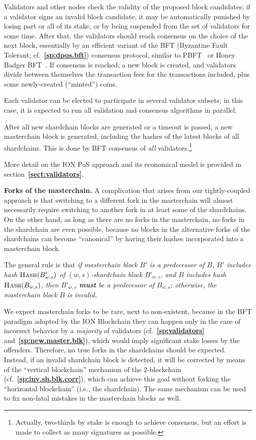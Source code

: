 \documentclass[12pt,oneside]{article}
\def\makepoint#1{\medbreak\noindent{\bf #1.\ }}
\def\nxsubpoint{\refstepcounter{subsubsection}%
  \smallbreak\makepoint{\thesubsubsection}}
\def\refpoint#1{{\rm\textbf{\ref{#1}}}}
\let\ptref=\refpoint
\def\embt(#1.){\textbf{#1.}}
\def\opsc#1{\operatorname{\textsc{#1}}}
\def\Hash{\opsc{Hash}}
\begin{document}
Validators and other nodes check the validity of the proposed block
candidates; if a validator signs an invalid block candidate, it may be
automatically punished by losing part or all of its stake, or by being
suspended from the set of validators for some time. After that, the
validators should reach consensus on the choice of the next block,
essentially by an efficient variant of the BFT (Byzantine Fault
Tolerant; cf.~\ptref{sp:dpos.bft}) consensus protocol, similar to
PBFT~\cite{PBFT} or Honey Badger BFT~\cite{HoneyBadger}. If consensus
is reached, a new block is created, and validators divide between
themselves the transaction fees for the transactions included, plus
some newly-created (``minted'') coins.

Each validator can be elected to participate in several validator
subsets; in this case, it is expected to run all validation and
consensus algorithms in parallel.

After all new shardchain blocks are generated or a timeout is passed,
a new masterchain block is generated, including the hashes of the
latest blocks of all shardchains. This is done by BFT consensus of
{\em all\/} validators.\footnote{Actually, two-thirds by stake is
  enough to achieve consensus, but an effort is made to collect as
  many signatures as possible.}

More detail on the ION PoS approach and its economical model is
provided in section~\ptref{sect:validators}.

\nxsubpoint \embt(Forks of the masterchain.)  A complication that
arises from our tightly-coupled approach is that switching to a
different fork in the masterchain will almost necessarily require
switching to another fork in at least some of the shardchains. On the
other hand, as long as there are no forks in the masterchain, no forks
in the shardchain are even possible, because no blocks in the
alternative forks of the shardchains can become ``canonical'' by
having their hashes incorporated into a masterchain block.

The general rule is that {\em if masterchain block $B'$ is a
  predecessor of $B$, $B'$ includes hash $\Hash(B'_{w,s})$ of
  $(w,s)$-shardchain block $B'_{w,s}$, and $B$ includes hash
  $\Hash(B_{w,s})$, then $B'_{w,s}$ {\bf must} be a predecessor of
  $B_{w,s}$; otherwise, the masterchain block $B$ is invalid.}

We expect masterchain forks to be rare, next to non-existent, because
in the BFT paradigm adopted by the ION Blockchain they can happen only
in the case of incorrect behavior by a {\em majority\/} of validators
(cf.~\ptref{sp:validators} and~\ptref{sp:new.master.blk}), which would
imply significant stake losses by the offenders. Therefore, no true
forks in the shardchains should be expected. Instead, if an invalid
shardchain block is detected, it will be corrected by means of the
``vertical blockchain'' mechanism of the 2-blockchain
(cf.~\ptref{sp:inv.sh.blk.corr}), which can achieve this goal without
forking the ``horizontal blockchain'' (i.e., the shardchain). The same
mechanism can be used to fix non-fatal mistakes in the masterchain
blocks as well.
\end{document}
